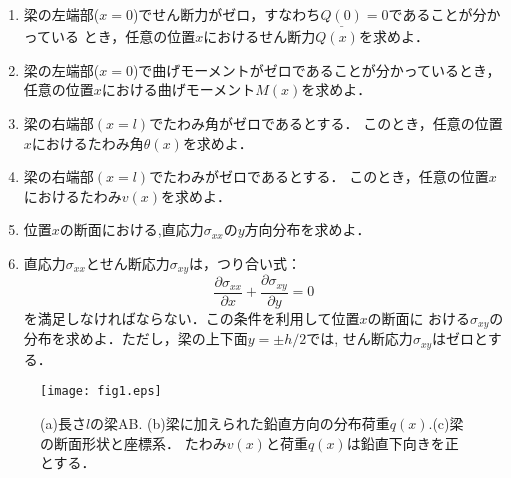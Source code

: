 \documentclass[10pt,a4j]{jarticle}
\begin{document}
\begin{enumerate}
\item
	梁の左端部($x=0$)でせん断力がゼロ，すなわち$\underline{Q(0)}=0$であることが分かっている
	とき，任意の位置$x$におけるせん断力$Q(x)$を求めよ．
\item
	梁の左端部($x=0$)で曲げモーメントがゼロであることが分かっているとき，
	任意の位置$x$における曲げモーメント$M(x)$を求めよ．
\item
	梁の右端部$\left(x=l\right)$でたわみ角がゼロであるとする．
	このとき，任意の位置$x$におけるたわみ角$\theta(x)$を求めよ．
\item
	梁の右端部$\left(x=l\right)$でたわみがゼロであるとする．
	このとき，任意の位置$x$におけるたわみ$v(x)$を求めよ．
\item
	位置$x$の断面における,直応力$\sigma_{xx}$の$y$方向分布を求めよ．     
\item
	直応力$\sigma_{xx}$とせん断応力$\sigma_{xy}$は，つり合い式：
	\[
		\frac{\partial \sigma_{xx}}{\partial x}
		+
		\frac{\partial \sigma_{xy}}{\partial y}
		=0
	\]
	を満足しなければならない．この条件を利用して位置$x$の断面に
	おける$\sigma_{xy}$の分布を求めよ．ただし，梁の上下面$y=\pm h/2$では, 
	せん断応力$\sigma_{xy}$はゼロとする．
\end{enumerate}
\begin{figure}[h]
	\begin{center}
	\texttt{[image: fig1.eps]} 
	\end{center}
	\caption{(a)長さ$l$の梁AB. (b)梁に加えられた鉛直方向の分布荷重$q(x)$.(c)梁の断面形状と座標系．
        たわみ$v(x)$と荷重$q(x)$は鉛直下向きを正とする．}
	\label{fig:fig1}
\end{figure}
\end{document}

